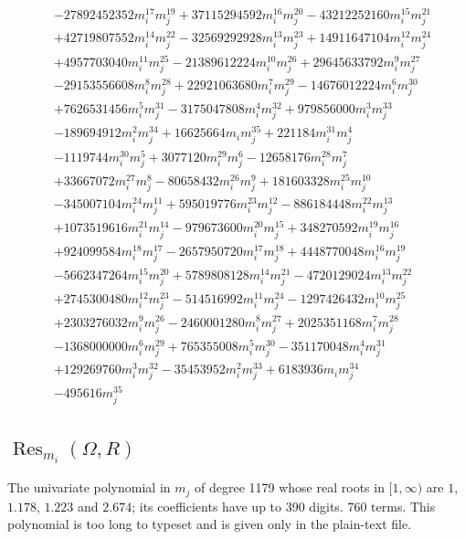 {\begin{align*}
&-27892452352m_i^{17}m_j^{19}+37115294592m_i^{16}m_j^{20}-43212252160m_i^{15}m_j^{21}\\
&+42719807552m_i^{14}m_j^{22}-32569292928m_i^{13}m_j^{23}+14911647104m_i^{12}m_j^{24}\\
&+4957703040m_i^{11}m_j^{25}-21389612224m_i^{10}m_j^{26}+29645633792m_i^{9}m_j^{27}\\
&-29153556608m_i^{8}m_j^{28}+22921063680m_i^{7}m_j^{29}-14676012224m_i^{6}m_j^{30}\\
&+7626531456m_i^{5}m_j^{31}-3175047808m_i^{4}m_j^{32}+979856000m_i^{3}m_j^{33}\\
&-189694912m_i^{2}m_j^{34}+16625664m_im_j^{35}+221184m_i^{31}m_j^{4}\\
&-1119744m_i^{30}m_j^{5}+3077120m_i^{29}m_j^{6}-12658176m_i^{28}m_j^{7}\\
&+33667072m_i^{27}m_j^{8}-80658432m_i^{26}m_j^{9}+181603328m_i^{25}m_j^{10}\\
&-345007104m_i^{24}m_j^{11}+595019776m_i^{23}m_j^{12}-886184448m_i^{22}m_j^{13}\\
&+1073519616m_i^{21}m_j^{14}-979673600m_i^{20}m_j^{15}+348270592m_i^{19}m_j^{16}\\
&+924099584m_i^{18}m_j^{17}-2657950720m_i^{17}m_j^{18}+4448770048m_i^{16}m_j^{19}\\
&-5662347264m_i^{15}m_j^{20}+5789808128m_i^{14}m_j^{21}-4720129024m_i^{13}m_j^{22}\\
&+2745300480m_i^{12}m_j^{23}-514516992m_i^{11}m_j^{24}-1297426432m_i^{10}m_j^{25}\\
&+2303276032m_i^{9}m_j^{26}-2460001280m_i^{8}m_j^{27}+2025351168m_i^{7}m_j^{28}\\
&-1368000000m_i^{6}m_j^{29}+765355008m_i^{5}m_j^{30}-351170048m_i^{4}m_j^{31}\\
&+129269760m_i^{3}m_j^{32}-35453952m_i^{2}m_j^{33}+6183936m_im_j^{34}\\
&-495616m_j^{35}
\end{align*}
}

\subsection*{$\operatorname{Res}_{m_i}(\Omega,R)$}
The univariate polynomial in $m_j$ of degree 1179 whose real roots in $[1,\infty)$ are $1$, $1.178$, $1.223$ and $2.674$; its coefficients have up to 390 digits. 760 terms.
This polynomial is too long to typeset and is given only in the plain-text file.


